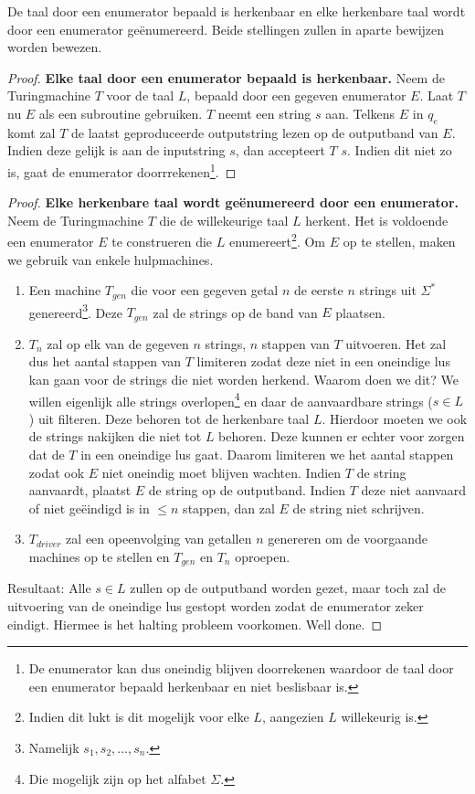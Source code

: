 \begin{theorem}
	De taal door een enumerator bepaald is herkenbaar en elke herkenbare taal wordt door een enumerator ge\"enumereerd. Beide stellingen zullen in aparte bewijzen worden bewezen.
\end{theorem}

\begin{proof}
	\textbf{Elke taal door een enumerator bepaald is herkenbaar.} Neem de Turingmachine $T$ voor de taal $L$, bepaald door een gegeven enumerator $E$. Laat $T$ nu $E$ als een subroutine gebruiken. $T$ neemt een string $s$ aan. Telkens $E$ in $q_e$ komt zal $T$ de laatst geproduceerde outputstring lezen op de outputband van $E$. Indien deze gelijk is aan de inputstring $s$, dan accepteert $T$ $s$. Indien dit niet zo is, gaat de enumerator doorrrekenen\footnote{De enumerator kan dus oneindig blijven doorrekenen waardoor de taal door een enumerator bepaald herkenbaar en niet beslisbaar is.}.
\end{proof}

\begin{proof}
	\textbf{Elke herkenbare taal wordt ge\"enumereerd door een enumerator.} Neem de Turingmachine $T$ die de willekeurige taal $L$ herkent. Het is voldoende een enumerator $E$ te construeren die $L$ enumereert\footnote{Indien dit lukt is dit mogelijk voor elke $L$, aangezien $L$ willekeurig is.}. Om $E$ op te stellen, maken we gebruik van enkele hulpmachines.\\
	\begin{enumerate}
		\item Een machine $T_{gen}$ die voor een gegeven getal $n$ de eerste $n$ strings uit $\Sigma^*$ genereerd\footnote{Namelijk $s_1,s_2, \dots ,s_n$.}. Deze $T_{gen}$ zal de strings op de band van $E$ plaatsen.
		\item $T_n$  zal op elk van de gegeven $n$ strings, $n$ stappen van $T$ uitvoeren. Het zal dus het aantal stappen van $T$ limiteren zodat deze niet in een oneindige lus kan gaan voor de strings die niet worden herkend. Waarom doen we dit? We willen eigenlijk alle strings overlopen\footnote{Die mogelijk zijn op het alfabet $\Sigma$.} en daar de aanvaardbare strings ($s \in L$) uit filteren. Deze behoren tot de herkenbare taal $L$. Hierdoor moeten we ook de strings nakijken die niet tot $L$ behoren. Deze kunnen er echter voor zorgen dat de $T$ in een oneindige lus gaat. Daarom limiteren we het aantal stappen zodat ook $E$ niet oneindig moet blijven wachten. Indien $T$ de string aanvaardt, plaatst $E$ de string op de outputband. Indien $T$ deze niet aanvaard of niet ge\"eindigd is in $\leq n$ stappen, dan zal $E$ de string niet schrijven.
		\item $T_{driver}$ zal een opeenvolging van getallen $n$ genereren om de voorgaande machines op te stellen en $T_{gen}$ en $T_n$ oproepen.\\
	\end{enumerate}
	Resultaat: Alle $s \in L$ zullen op de outputband worden gezet, maar toch zal de uitvoering van de oneindige lus gestopt worden zodat de enumerator zeker eindigt. Hiermee is het halting probleem voorkomen. Well done.
\end{proof}

